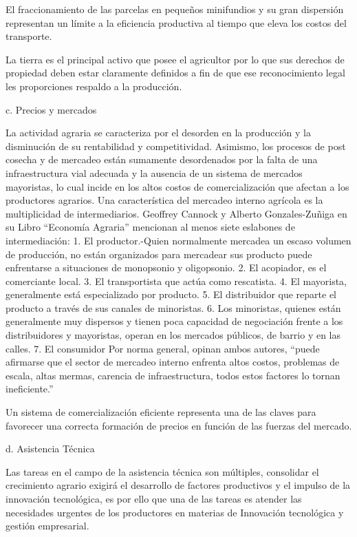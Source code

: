 \documentclass{report}
\begin{document}
El fraccionamiento de las parcelas en pequeños minifundios y su gran dispersión representan un límite a la eficiencia productiva al tiempo que eleva los costos del transporte.

La tierra es el principal activo que posee el agricultor por lo que sus derechos
de propiedad deben estar claramente definidos a fin de que ese reconocimiento
legal les proporciones respaldo a la producción.

c. Precios y mercados

La actividad agraria se caracteriza por el desorden en la producción y la disminución de su rentabilidad y competitividad. Asimismo, los procesos de post cosecha y de mercadeo están sumamente desordenados por la falta de una infraestructura vial adecuada y la ausencia de un sistema de mercados mayoristas, lo cual incide en los altos costos de comercialización que afectan a los productores agrarios.
Una característica del mercadeo interno agrícola es la multiplicidad de intermediarios. Geoffrey Cannock y Alberto Gonzales-Zuñiga en su Libro “Economía Agraria” mencionan al menos siete eslabones de intermediación:
1. El productor.-Quien normalmente mercadea un escaso volumen de producción, no están organizados para mercadear sus producto puede enfrentarse a situaciones de monopsonio y oligopsonio.
2. El acopiador, es el comerciante local.
3. El transportista que actúa como rescatista.
4. El mayorista, generalmente está especializado por producto.
5. El distribuidor que reparte el producto a través de sus canales de minoristas.
6. Los minoristas, quienes están generalmente muy dispersos y tienen poca capacidad de negociación frente a los distribuidores y mayoristas, operan en los mercados públicos, de barrio y en las calles.
7. El consumidor
Por norma general, opinan ambos autores, “puede afirmarse que el sector de mercadeo interno enfrenta altos costos, problemas de escala, altas mermas, carencia de infraestructura, todos estos factores lo tornan ineficiente.”

Un sistema de comercialización eficiente representa una de las claves para favorecer una correcta formación de precios en función de las fuerzas del mercado.

d. Asistencia Técnica

Las tareas en el campo de la asistencia técnica son múltiples, consolidar el
crecimiento agrario exigirá el desarrollo de factores productivos y el impulso
de la innovación tecnológica, es por ello que una de las tareas es atender las
necesidades urgentes de los productores en materias de Innovación tecnológica y
gestión empresarial.
\end{document}
